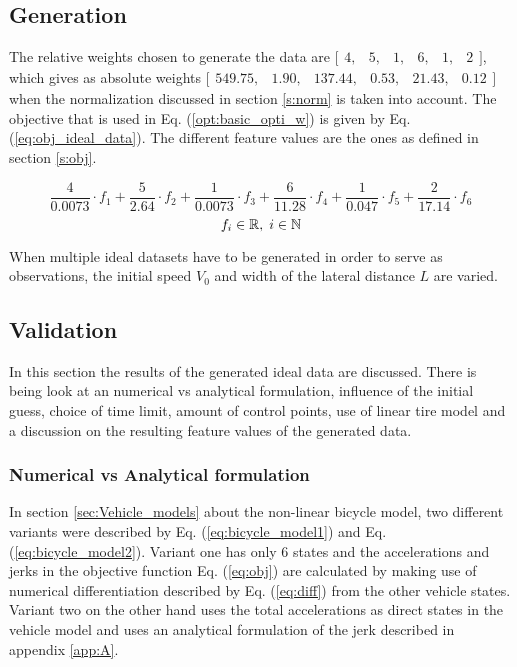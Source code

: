 \subsection{Generation}
\label{s:generation}
The relative weights chosen to generate the data are $ \bigl[ \begin{smallmatrix} 4,&5,&1,&6,&1,&2\end{smallmatrix}\bigr]$, which gives as absolute weights  $ \bigl[ \begin{smallmatrix} 549.75, &1.90, &137.44  ,&0.53,  &21.43, &0.12\end{smallmatrix}\bigr]$ when the normalization discussed in section \ref{s:norm} is taken into account. The objective that is used in Eq. (\ref{opt:basic_opti_w}) is given by Eq. (\ref{eq:obj_ideal_data}). The different feature values are the ones as defined in section \ref{s:obj}.

\begin{equation}\label{eq:obj_ideal_data}
\frac{4}{0.0073} \cdot f_1 +\frac{5}{2.64} \cdot f_2 +\frac{1}{0.0073} \cdot f_3 +\frac{6}{11.28} \cdot f_4 +\frac{1}{0.047} \cdot f_5 +\frac{2}{17.14} \cdot f_6 
\end{equation}
\[	f_i \in \mathbb{R}, \hspace{1mm}
i \in \mathbb{N}\]

 When multiple ideal datasets have to be generated in order to serve as observations, the initial speed $V_{0}$ and width of the lateral distance $L$ are varied.\\

\subsection{Validation} \label{s:GD_val}
In this section the results of the generated ideal data are discussed. There is being look at an numerical vs analytical formulation, influence of the initial guess, choice of time limit, amount of control points, use of linear tire model and a discussion on the resulting feature values of the generated data.

\subsubsection{Numerical vs Analytical formulation}
In section \ref{sec:Vehicle_models} about the non-linear bicycle model, two different variants were described by Eq. (\ref{eq:bicycle_model1}) and Eq. (\ref{eq:bicycle_model2}). Variant one has only 6 states and the accelerations and jerks in the objective function Eq. (\ref{eq:obj}) are calculated by making use of numerical differentiation described by Eq. (\ref{eq:diff}) from the other vehicle states. Variant two on the other hand uses the total accelerations as direct states in the vehicle model and uses an analytical formulation of the jerk described in appendix \ref{app:A}.

